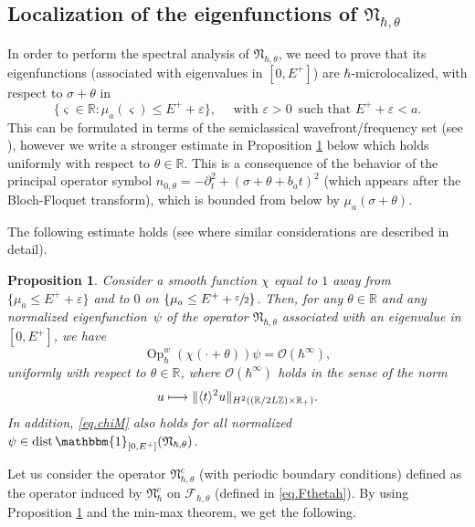 \documentclass[JEP,XML,SOM,Unicode,NoFloatCountersInSection,published]{cedram}
\newcommand\mto{\mathchoice{\longmapsto}{\mapsto}{\mapsto}{\mapsto}}
\let\sep:
\let\epsilon\varepsilon
\DeclareMathOperator{\dist}{dist}
\DeclareMathOperator{\Op}{Op}
\let\mathds\mathbbm
\theoremstyle{plain}
\newtheorem{proposition}[theorem]{Proposition}
\theoremstyle{definition}
\newcommand{\R}{\mathbb{R}}
\newcommand{\Z}{\mathbb{Z}}
\begin{document}
\subsection{Localization of the eigenfunctions of $\mathfrak{N}_{\hbar,\theta}$}
In order to perform the spectral analysis of $\mathfrak{N}_{\hbar,\theta}$, we need to prove that its eigenfunctions (associated with eigenvalues in $[0,E^+]$) are $\hbar$-microlocalized, with respect to $\sigma+\theta$ in
\[
\{\varsigma\in\R \sep \mu_a(\varsigma)\leq E^++\epsilon\},\quad \mbox{ with } \epsilon>0\, \mbox{ such that }E^++\epsilon<a.
\]
This can be formulated in terms of the semiclassical wavefront/frequency set (see \cite[\S 8.4.2, p.\,188]{Zworski}), however we write a stronger estimate in Proposition \ref{prop:mlc} below which holds uniformly with respect to $\theta\in\mathbb{R}$. This is a consequence of the behavior of the principal operator symbol $n_{0,\theta}=-\partial^2_t+(\sigma+\theta+b_a t)^2$ (which appears after the Bloch-Floquet transform), which is bounded from below by $\mu_a(\sigma+\theta)$.

The following estimate holds (see \cite[\S 5]{BHR22} where similar considerations are described in detail).

\begin{proposition}\label{prop:mlc}
Consider a smooth function $\chi$ equal to $1$ away from \hbox{$\{\mu_a\!\leq\! E^+\!+\!\epsilon\}$} and to $0$ on $\{\mu_a\leq E^++\sfrac{\epsilon}{2}\}$. Then, for any $\theta\in\mathbb{R}$ and any normalized eigenfunction~$\psi$ of the operator $\mathfrak N_{\hbar, \theta}$ associated with an eigenvalue in $[0,E^+]$, we have
\begin{equation}\label{eq.chiM}
\Op^w_\hbar (\chi(\cdot+\theta))\psi=\mathscr{O}(\hbar^\infty),
\end{equation}
uniformly with respect to $\theta\in\mathbb{R}$, where $\mathscr{O}(\hbar^\infty)$ holds in the sense of the norm
\[
u\mto \|\langle t\rangle^2 u\|_{H^2((\R/2L\Z)\times\R_+)}.
\]
In addition, \eqref{eq.chiM} also holds for all normalized $\psi\in \dist\mathds{1}_{[0,E^+]}(\mathfrak{N}_{\hbar,\theta})$.
\end{proposition}

Let us consider the operator $\mathfrak{N}^c_{\hbar,\theta}$ (with periodic boundary conditions) defined as the operator induced by $\mathfrak{N}^c_{\hbar}$ on $\mathscr{F}_{\hbar, \theta} $ (defined in \eqref{eq.Fthetah}). By using Proposition \ref{prop:mlc} and the min-max theorem, we get the following.
\end{document}
